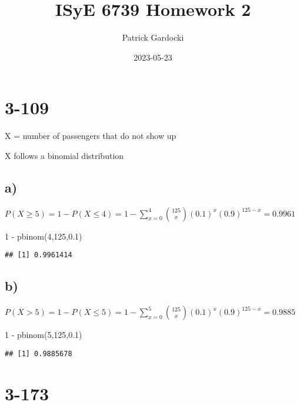 \documentclass[
]{article}
\title{ISyE 6739 Homework 2}
\author{Patrick Gardocki}
\date{2023-05-23}
\newenvironment{Shaded}{\begin{snugshade}}{\end{snugshade}}
\newcommand{\DecValTok}[1]{\textcolor[rgb]{0.00,0.00,0.81}{#1}}
\newcommand{\FloatTok}[1]{\textcolor[rgb]{0.00,0.00,0.81}{#1}}
\newcommand{\FunctionTok}[1]{\textcolor[rgb]{0.00,0.00,0.00}{#1}}
\newcommand{\NormalTok}[1]{#1}
\newcommand{\SpecialCharTok}[1]{\textcolor[rgb]{0.00,0.00,0.00}{#1}}
\begin{document}
\maketitle

\hypertarget{section}{%
\section{3-109}\label{section}}

X = number of passengers that do not show up

X follows a binomial distribution

\hypertarget{a}{%
\subsection{a)}\label{a}}

\(P(X \ge 5) = 1 - P(X\le 4) = 1 - \sum\limits_{x=0}^{4} {125 \choose x}(0.1)^x(0.9)^{125-x} = 0.9961\)

\begin{Shaded}
\begin{Highlighting}[]
\DecValTok{1} \SpecialCharTok{{-}} \FunctionTok{pbinom}\NormalTok{(}\DecValTok{4}\NormalTok{,}\DecValTok{125}\NormalTok{,}\FloatTok{0.1}\NormalTok{)}
\end{Highlighting}
\end{Shaded}

\begin{verbatim}
## [1] 0.9961414
\end{verbatim}

\hypertarget{b}{%
\subsection{b)}\label{b}}

\(P(X>5) = 1 - P(X\le 5) = 1 - \sum\limits_{x=0}^{5} {125 \choose x}(0.1)^x(0.9)^{125-x} = 0.9885\)

\begin{Shaded}
\begin{Highlighting}[]
\DecValTok{1} \SpecialCharTok{{-}} \FunctionTok{pbinom}\NormalTok{(}\DecValTok{5}\NormalTok{,}\DecValTok{125}\NormalTok{,}\FloatTok{0.1}\NormalTok{)}
\end{Highlighting}
\end{Shaded}

\begin{verbatim}
## [1] 0.9885678
\end{verbatim}

\hypertarget{section-1}{%
\section{3-173}\label{section-1}}
\end{document}
